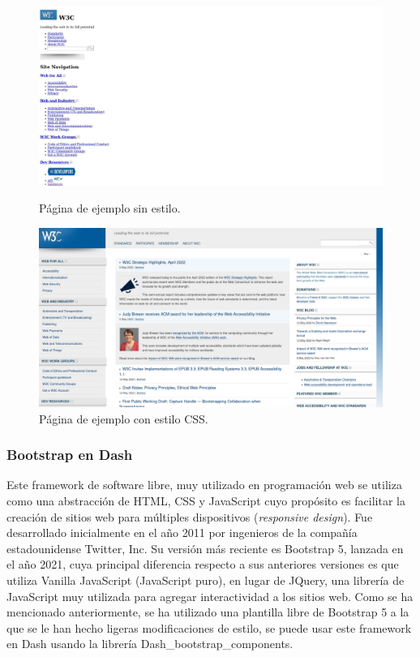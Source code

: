 \documentclass[a4paper, 12pt, oneside]{book}
\begin{document}
\begin{figure}[H]
  \centering
  \begin{minipage}[b]{0.4\textwidth}
    \includegraphics[width=\textwidth]{img/w3c_sin_css}
    \caption{Página de ejemplo sin estilo.}
    \label{figura:w3c_sin_css}
  \end{minipage}
  \hfill
  \begin{minipage}[b]{0.4\textwidth}
    \includegraphics[width=\textwidth]{img/w3c_con_css}
    \caption{Página de ejemplo con estilo CSS.}
    \label{figura:w3c_con_css}
  \end{minipage}
\end{figure}

\subsubsection{Bootstrap en Dash}
\label{subsubsec:boostrap}
Este framework de software libre, muy utilizado en programación web se utiliza como una abstracción de HTML, CSS y JavaScript cuyo propósito es facilitar la creación de sitios web para múltiples dispositivos (\textit{responsive design}). Fue desarrollado inicialmente en el año 2011 por ingenieros de la compañía estadounidense Twitter, Inc. Su versión más reciente es Bootstrap 5, lanzada en el año 2021, cuya principal diferencia respecto a sus anteriores versiones es que utiliza Vanilla JavaScript (JavaScript puro), en lugar de JQuery, una librería de JavaScript muy utilizada para agregar interactividad a los sitios web.
Como se ha mencionado anteriormente, se ha utilizado una plantilla libre de Bootstrap 5 a la que se le han hecho ligeras modificaciones de estilo, se puede usar este framework en Dash usando la librería Dash\_bootstrap\_components.
\end{document}

